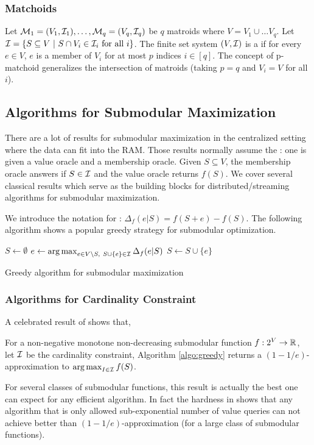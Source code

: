 \subsubsection{Matchoids}
Let $\mathcal{M}_1 = (V_1, \mathcal{I}_1),\ldots, \mathcal{M}_q = (V_q, \mathcal{I}_q)$ be $q$ matroids where $V = V_1\cup\ldots V_q$. Let $\mathcal{I} = \{S\subseteq V~|~ S\cap V_i \in \mathcal{I}_i ~\text{for all}~ i\}$. The finite set system $(V, \mathcal{I})$ is a  if for every $e\in V$, $e$ is a member of $V_i$ for at most $p$ indices $i \in [q]$. The concept of p-matchoid generalizes the intersection of matroids (taking $p = q$ and $V_i = V$ for all $i$).

\subsection{Algorithms for Submodular Maximization}
There are a lot of results for submodular maximization in the centralized setting where the data can fit into the RAM. Those results normally assume the : one is given a value oracle and a membership oracle. Given $S\subseteq V$, the membership oracle answers if $S \in \mathcal{I}$ and the value oracle returns $f(S)$. We cover several classical results which serve as the building blocks for distributed/streaming algorithms for submodular maximization.

We introduce the notation for : $\Delta_f(e|S) = f(S + e) - f(S)$. The following algorithm shows a popular greedy strategy for submodular optimization.

\begin{algorithm}[H]
\DontPrintSemicolon %
$S \gets \emptyset$\;
 {
  $e \gets \operatorname*{arg\,max}_{e\in V\backslash S, ~S\cup\{e\}\in \mathcal{I}} \Delta_f(e|S)$\;\label{line:emax}
  $S \gets S\cup \{e\}$\;
}
\;
\caption{{\sc Greedy} algorithm for submodular maximization}
\label{algo:greedy}
\end{algorithm}


\subsubsection{Algorithms for Cardinality Constraint}


A celebrated result of \cite{NWF78} shows that,
\begin{theorem}
  \label{thm:1978}
  For a non-negative monotone non-decreasing submodular function $f: 2^V \rightarrow \mathbb{R}$, let $\mathcal{I}$ be the cardinality constraint, Algorithm \ref{algo:greedy} returns a $(1 - 1/e)$-approximation to $\operatorname*{arg\,max}_{I\in \mathcal{I}} f(S)$.
\end{theorem}
For several classes of submodular functions, this result is actually the best one can expect for any efficient algorithm. In fact the hardness in \cite{NWF78,F98} shows that any algorithm that is only allowed sub-exponential number of value queries can not achieve better than $(1 - 1/e)$-approximation (for a large class of submodular functions).


